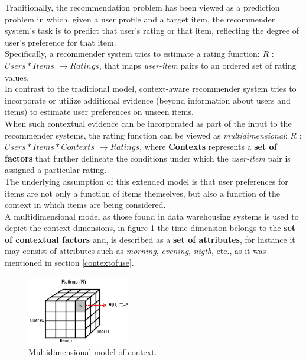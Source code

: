 Traditionally, the recommendation problem has been viewed as a
prediction problem in which, given a user profile and a target item,
the recommender system's task is to predict that user's rating or that
item, reflecting the degree of user's preference for that 
item\cite{jannach2010recommender}. \\
Specifically, a recommender system tries to estimate a rating
function: $R$ : $Users * Items$ $ \rightarrow Ratings$, that maps
\textit{user-item} pairs to an ordered  set of rating values.\\
In contrast to the traditional model, context-aware recommender system
tries to incorporate or utilize additional evidence (beyond
information about users and items) to estimate user preferences on
unseen items.\\ When such contextual evidence can be incorporated as
part of the input to the recommender systems, the rating function can
be viewed as \textit{multidimensional}: $R$ : $Users * Items *
Contexts$ $ \rightarrow Ratings$, where \textbf{Contexts} represents a
\textbf{set of factors} that further delineate the conditions under which the
\textit{user-item} pair is assigned a particular rating. \\ The
underlying assumption of this extended model is that user preferences
for items are not only a function of items themselves, but also a
function of the context in which items are being
considered\cite{lim2009assessing}. \\
A multidimensional model as those found in data warehousing 
systems\cite{kimball2011data} is
used to depict the context dimensions, in figure
\ref{fig:multidimension} the time dimension belongs to the \textbf{set of 
contextual factors} and, is described as a \textbf{set of
attributes}, for instance it may consist of
attributes such as \textit{morning}, \textit{evening},  \textit{nigth},
etc., as it was mentioned in section  \ref{contextofuse}. 
\begin{figure}
\captionsetup{font=footnotesize}
\centering
\includegraphics[width=0.40\textwidth]{img/multidimension.png}
\small
\caption{Multidimensional model of context.}
\label{fig:multidimension}   
\end{figure}

